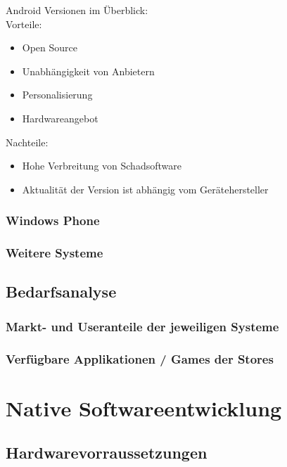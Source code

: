 Android Versionen im Überblick:
\\

Vorteile:
\begin{itemize}
	\item Open Source
	\item Unabhängigkeit von Anbietern
	\item Personalisierung
	\item Hardwareangebot
\end{itemize}

Nachteile:
\begin{itemize}
	\item Hohe Verbreitung von Schadsoftware
	\item Aktualität der Version ist abhängig vom Gerätehersteller
\end{itemize}


\subsection{Windows Phone}
\subsection{Weitere Systeme}

\section{Bedarfsanalyse}
\subsection{Markt- und Useranteile der jeweiligen Systeme}
\subsection{Verfügbare Applikationen / Games der Stores}

\chapter{Native Softwareentwicklung}
\section{Hardwarevorraussetzungen}
